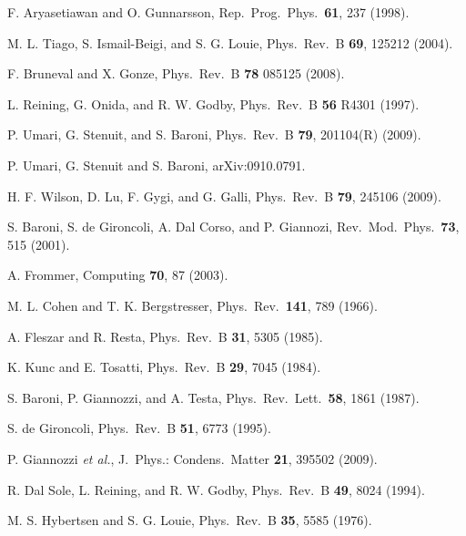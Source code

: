 \documentclass[twocolumn,prb,showpacs,superscriptaddress]{revtex4}
\begin{document}
\begin{thebibliography}{99}
F. Aryasetiawan and O. Gunnarsson,
Rep.\ Prog.\ Phys.\ {\bf 61}, 237 (1998). 

M. L. Tiago, S. Ismail-Beigi, and S. G. Louie,
Phys.\ Rev.\ B {\bf 69}, 125212 (2004).

F. Bruneval and X. Gonze,
Phys.\ Rev.\ B {\bf 78} 085125 (2008).

L. Reining, G. Onida, and R. W. Godby, 
Phys.\ Rev.\ B {\bf 56} R4301 (1997).

P. Umari, G. Stenuit, and S. Baroni,
Phys.\ Rev.\ B {\bf 79}, 201104(R) (2009).

P. Umari, G. Stenuit and S. Baroni,
arXiv:0910.0791.

H. F. Wilson, D. Lu, F. Gygi, and G. Galli,
Phys.\ Rev.\ B {\bf 79}, 245106 (2009).

S. Baroni, S. de Gironcoli, A. Dal Corso, and P. Giannozi, 
Rev.\ Mod.\ Phys.\ {\bf 73}, 515 (2001).

A. Frommer,
Computing {\bf 70}, 87 (2003).

M. L. Cohen and T. K. Bergstresser,
Phys.\ Rev.\ {\bf 141}, 789 (1966).

A. Fleszar and R. Resta,
Phys.\ Rev.\ B {\bf 31}, 5305 (1985).

K. Kunc and E. Tosatti,
Phys.\ Rev.\ B {\bf 29}, 7045 (1984).

S. Baroni, P. Giannozzi, and A. Testa,
Phys.\ Rev.\ Lett.\ {\bf 58}, 1861 (1987).

S. de Gironcoli,
Phys.\ Rev.\ B {\bf 51}, 6773 (1995).

P. Giannozzi {\it et al.},
J.\ Phys.: Condens.\ Matter {\bf 21}, 395502 (2009).

R. Dal Sole, L. Reining, and R. W. Godby,
Phys.\ Rev.\ B {\bf 49}, 8024 (1994).

M. S. Hybertsen and S. G. Louie,
Phys.\ Rev.\ B {\bf 35}, 5585 (1976).


\end{thebibliography}
\end{document}
